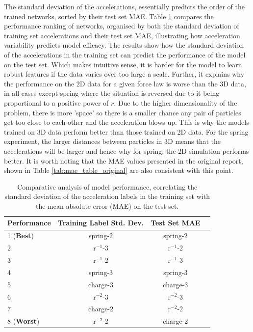 \documentclass[11pt]{article}
\begin{document}
The standard deviation of the accelerations, essentially predicts the order of the trained networks, sorted by their test set MAE. Table \ref{tab:std_table_2} compares the performance ranking of networks, organised by both the standard deviation of training set accelerations and their test set MAE, illustrating how acceleration variability predicts model efficacy. The results show how the standard deviation of the accelerations in the training set can predict the performance of the model on the test set. Which makes intuitive sense, it is harder for the model to learn robust features if the data varies over too large a scale. Further, it explains why the performance on the 2D data for a given force law is worse than the 3D data, in all cases except spring where the situation is reversed due to it being proportional to a positive power of $r$. Due to the higher dimensionality of the problem, there is more 'space' so there is a smaller chance any pair of particles get too close to each other and the acceleration blows up. This is why the models trained on 3D data perform better than those trained on 2D data. For the spring experiment, the larger distances between particles in 3D means that the accelerations will be larger and hence why for spring, the 2D simulation performs better. It is worth noting that the MAE values presented in the original report, shown in Table \ref{tab:mae_table_original} are also consistent with this point.
\begin{table}[H]
    \centering
    \begin{tabular}{lccc}
    \toprule
    Performance & Training Label Std. Dev. & Test Set MAE\\
    \midrule
    1 (\textbf{Best}) & spring-2 & spring-2 \\
    2& r$^{-1}$-3 & r$^{-1}$-2  \\
    3& r$^{-1}$-2 & r$^{-1}$-3 \\
    4& spring-3 & spring-3\\
    5& charge-3 & charge-3\\
    6& r$^{-2}$-3 & r$^{-2}$-3\\
    7& charge-2 & r$^{-2}$-2\\
    8 (\textbf{Worst})& r$^{-2}$-2 & charge-2\\
    \bottomrule
    \end{tabular}
    \caption{Comparative analysis of model performance, correlating the standard deviation of the acceleration labels in the training set with the mean absolute error (MAE) on the test set.}
    \label{tab:std_table_2}
    \end{table}
\end{document}
